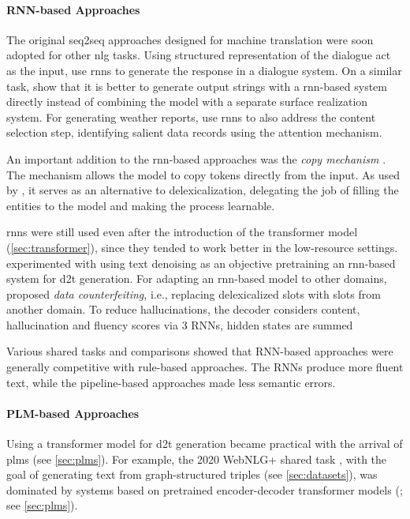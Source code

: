 \paragraph{RNN-based Approaches} The original seq2seq approaches designed for machine translation \cite{cho2014learning,sutskever2014sequence} were soon adopted for other \ac{nlg} tasks. Using structured representation of the dialogue act as the input, \citet{wen2015semantically} use \acp{rnn} to generate the response in a dialogue system. On a similar task, \citet{dusekSequencetoSequenceGenerationSpoken2016} show that it is better to generate output strings with a \ac{rnn}-based system directly instead of combining the model with a separate surface realization system. For generating weather reports, \citet{mei2016talk} use \acp{rnn} to also address the content selection step, identifying salient data records using the attention mechanism.

An important addition to the \ac{rnn}-based approaches was the \emph{copy mechanism} \cite{gu2016incorporating,seeGetPointSummarization2017}. The mechanism allows the model to copy tokens directly from the input. As used by \citet{gehrmannEndtoEndContentPlan2018}, it serves as an alternative to delexicalization, delegating the job of filling the entities to the model and making the process learnable.

\acp{rnn} were still used even after the introduction of the transformer model (\autoref{sec:transformer}), since they tended to work better in the low-resource settings. \citet{freitagUnsupervisedNaturalLanguage2018} experimented with using text denoising as an objective pretraining an \ac{rnn}-based system for \ac{d2t} generation. For adapting an \ac{rnn}-based model to other domains, \citet{wen2020recurrent} proposed \emph{data counterfeiting}, i.e., replacing delexicalized slots with slots from another domain. To reduce hallucinations, \citet{rebuffel2021controlling} the decoder considers content, hallucination and fluency scores via 3 RNNs, hidden states are summed

Various shared tasks and comparisons \cite{gardentWebNLGChallengeGenerating2017,dusekEvaluatingStateoftheartEndtoEnd2020,ferreiraNeuralDatatotextGeneration2019} showed that RNN-based approaches were generally competitive with rule-based approaches. The RNNs produce more fluent text, while the pipeline-based approaches made less semantic errors.


\paragraph{PLM-based Approaches} Using a transformer model for \ac{d2t} generation became practical with the arrival of \acp{plm} (see \autoref{sec:plms}). For example, the 2020 WebNLG+ shared task \cite{ferreira20202020}, with the goal of generating text from graph-structured triples (see \autoref{sec:datasets}), was dominated by systems based on pretrained encoder-decoder transformer models (\citealp{yang2020improving,agarwalMachineTranslationAided2020,kasnerTrainHardFinetune2020}; see \autoref{sec:plms}).

